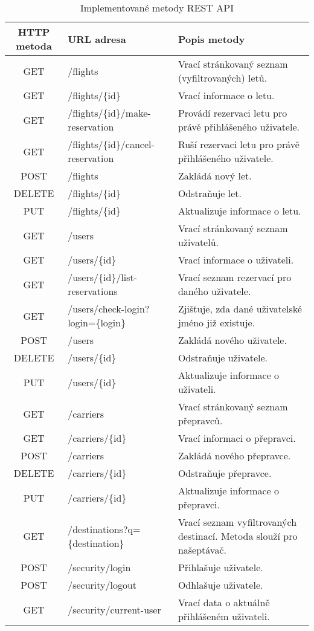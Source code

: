 \documentclass[ing,male,java,dept460,twoside]{diploma}						%
\begin{document}
\begin{table}
	\centering
	\begin{tabular}{|c|l|p{6cm}|}
		\hline
		HTTP metoda & URL adresa & Popis metody \\
		\hline
		GET & /flights & Vrací stránkovaný seznam (vyfiltrovaných) letů. \\
		\hline
		GET & /flights/\{id\} & Vrací informace o letu. \\
		\hline
		GET & /flights/\{id\}/make-reservation & Provádí rezervaci letu pro právě přihlášeného uživatele. \\
		\hline
		GET & /flights/\{id\}/cancel-reservation & Ruší rezervaci letu pro právě přihlášeného uživatele. \\
		\hline
		POST & /flights & Zakládá nový let. \\
		\hline
		DELETE & /flights/\{id\} & Odstraňuje let. \\
		\hline
		PUT & /flights/\{id\} & Aktualizuje informace o letu. \\


		\hline
		GET & /users & Vrací stránkovaný seznam uživatelů. \\
		\hline
		GET & /users/\{id\} & Vrací informace o uživateli. \\
		\hline
		GET & /users/\{id\}/list-reservations & Vrací seznam rezervací pro daného uživatele. \\
		\hline
		GET & /users/check-login?login=\{login\} & Zjišťuje, zda dané uživatelské jméno již existuje. \\
		\hline
		POST & /users & Zakládá nového uživatele. \\
		\hline
		DELETE & /users/\{id\} & Odstraňuje uživatele. \\
		\hline
		PUT & /users/\{id\} & Aktualizuje informace o uživateli. \\

		\hline
		GET & /carriers & Vrací stránkovaný seznam přepravců. \\
		\hline
		GET & /carriers/\{id\} & Vrací informaci o přepravci. \\
		\hline
		POST & /carriers & Zakládá nového přepravce. \\
		\hline
		DELETE & /carriers/\{id\} & Odstraňuje přepravce. \\
		\hline
		PUT & /carriers/\{id\} & Aktualizuje informace o přepravci. \\

		\hline
		GET & /destinations?q=\{destination\} & Vrací seznam vyfiltrovaných destinací. Metoda slouží pro našeptávač. \\

		\hline
		POST & /security/login & Přihlašuje uživatele. \\
		\hline
		POST & /security/logout & Odhlašuje uživatele. \\
		\hline
		GET & /security/current-user & Vrací data o aktuálně přihlášeném uživateli. \\
		\hline
	\end{tabular}
	\caption{Implementované metody REST API}
	\label{tab:RestAPI}
\end{table}
\end{document}
